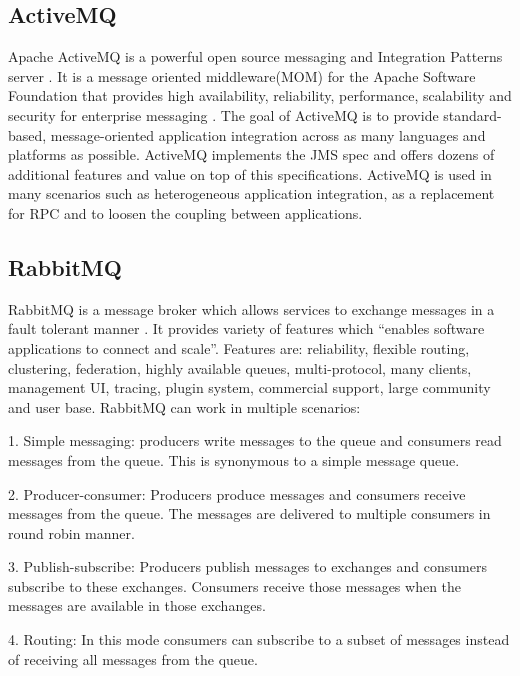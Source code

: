      \pv

\subsection{ActiveMQ}

     Apache ActiveMQ is a powerful open source messaging and
     Integration Patterns server \cite{www-activeMQ}. It is a message
     oriented middleware(MOM) for the Apache Software Foundation that
     provides high availability, reliability, performance, scalability
     and security for enterprise messaging \cite{ActiveMQ-book}. The
     goal of ActiveMQ is to provide standard-based, message-oriented
     application integration across as many languages and platforms as
     possible. ActiveMQ implements the JMS spec and offers dozens of
     additional features and value on top of this
     specifications. ActiveMQ is used in many scenarios such as
     heterogeneous application integration, as a replacement for RPC
     and to loosen the coupling between applications.
     
\subsection{RabbitMQ }

     RabbitMQ is a message broker which allows
     services to exchange messages in a fault tolerant manner \cite{www-rabbitmq}.
     It
     provides variety of features which ``enables software applications
     to connect and scale''. Features are: reliability, flexible
     routing, clustering, federation, highly available queues,
     multi-protocol, many clients, management UI, tracing, plugin
     system, commercial support, large community and user
     base. RabbitMQ can work in multiple scenarios:

     1. Simple messaging: producers write messages to the queue and
        consumers read messages from the queue. This is synonymous
        to a simple message queue.

     2. Producer-consumer: Producers produce messages and consumers
        receive messages from the queue. The messages are delivered to
        multiple consumers in round robin manner.

     3. Publish-subscribe: Producers publish messages to exchanges
        and consumers subscribe to these exchanges. Consumers receive
        those messages when the messages are available in those
        exchanges.

     4. Routing: In this mode consumers can subscribe to a subset
        of messages instead of receiving all messages from the queue.

